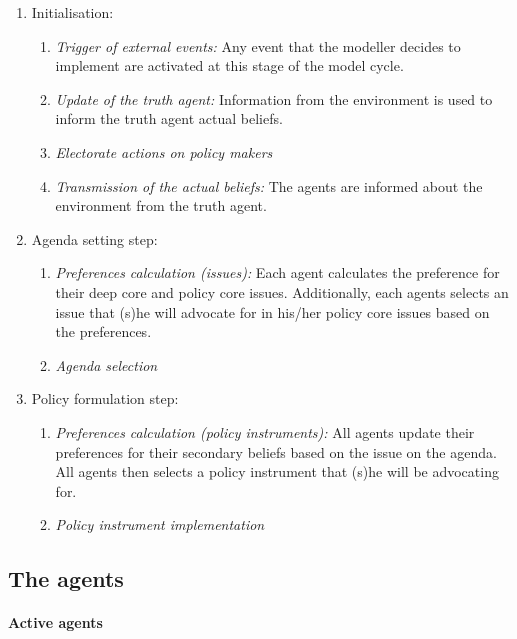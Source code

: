 \documentclass[11pt]{article}
\begin{document}
\begin{enumerate}
\item Initialisation:
	
	\begin{enumerate}
	\item \emph{Trigger of external events:} Any event that the modeller decides to implement are activated at this stage of the model cycle.
	\item \emph{Update of the truth agent:} Information from the environment is used to inform the truth agent actual beliefs.
	\item \emph{Electorate actions on policy makers}
	\item \emph{Transmission of the actual beliefs:} The agents are informed about the environment from the truth agent.
	\end{enumerate}
	
\item Agenda setting step:
	\begin{enumerate}
	\item \emph{Preferences calculation (issues):} Each agent calculates the preference for their deep core and policy core issues. Additionally, each agents selects an issue that (s)he will advocate for in his/her policy core issues based on the preferences.
	\item \emph{Agenda selection}
	\end{enumerate}
	
\item Policy formulation step:
	\begin{enumerate}
	\item \emph{Preferences calculation (policy instruments):} All agents update their preferences for their secondary beliefs based on the issue on the agenda. All agents then selects a policy instrument that (s)he will be advocating for.
	\item \emph{Policy instrument implementation} 
	\end{enumerate}

\end{enumerate}


\subsection{The agents}



\paragraph{Active agents}
\end{document}
